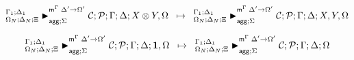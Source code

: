
\[
\trans{
   \matstatea{\Delta_N}{\lstack{C};
      \lstack{P}}{\Gamma}{\Delta}{X \otimes Y, \Omega}{\Delta' \rightarrow
         \Omega'}{\Sigma}
}
{
   \matstatea{\Delta_N}{\lstack{C};
      \lstack{P}}{\Gamma}{\Delta}{X, Y, \Omega}{\Delta' \rightarrow
         \Omega'}{\Sigma}
}
\]

\[
\trans{
   \matstatea{\Delta_N}{\lstack{C};
      \lstack{P}}{\Gamma}{\Delta}{\one, \Omega}{\Delta' \rightarrow
         \Omega'}{\Sigma}
}
{
   \matstatea{\Delta_N}{\lstack{C};
      \lstack{P}}{\Gamma}{\Delta}{\Omega}{\Delta' \rightarrow
         \Omega'}{\Sigma}
}
\]
